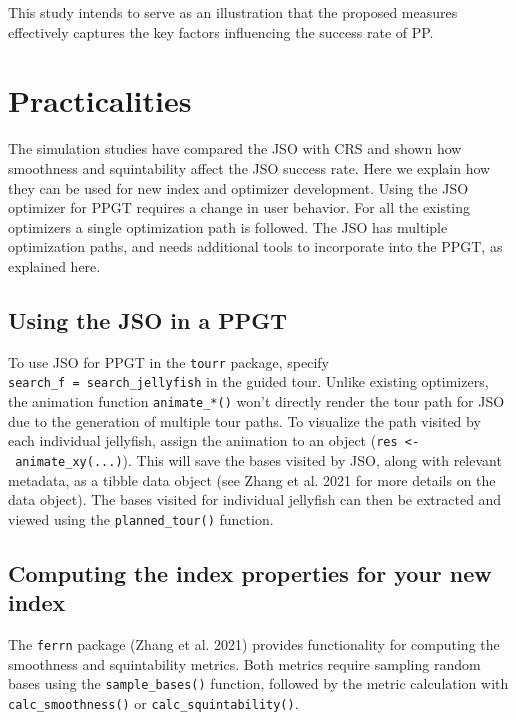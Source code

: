 \documentclass[
  12pt,
]{interact}
\theoremstyle{plain}
\begin{document}
\endgroup{}

This study intends to serve as an illustration that the proposed
measures effectively captures the key factors influencing the success
rate of PP.

\section{Practicalities}\label{sec-discussion}

The simulation studies have compared the JSO with CRS and shown how
smoothness and squintability affect the JSO success rate. Here we
explain how they can be used for new index and optimizer development.
Using the JSO optimizer for PPGT requires a change in user behavior. For
all the existing optimizers a single optimization path is followed. The
JSO has multiple optimization paths, and needs additional tools to
incorporate into the PPGT, as explained here.

\subsection{Using the JSO in a PPGT}\label{using-the-jso-in-a-ppgt}

To use JSO for PPGT in the \texttt{tourr} package, specify
\texttt{search\_f\ =\ search\_jellyfish} in the guided tour. Unlike
existing optimizers, the animation function \texttt{animate\_*()} won't
directly render the tour path for JSO due to the generation of multiple
tour paths. To visualize the path visited by each individual jellyfish,
assign the animation to an object
(\texttt{res\ \textless{}-\ animate\_xy(...)}). This will save the bases
visited by JSO, along with relevant metadata, as a tibble data object
(see Zhang et al. 2021 for more details on the data object). The bases
visited for individual jellyfish can then be extracted and viewed using
the \texttt{planned\_tour()} function.

\subsection{Computing the index properties for your new
index}\label{computing-the-index-properties-for-your-new-index}

The \texttt{ferrn} package (Zhang et al. 2021) provides functionality
for computing the smoothness and squintability metrics. Both metrics
require sampling random bases using the \texttt{sample\_bases()}
function, followed by the metric calculation with
\texttt{calc\_smoothness()} or \texttt{calc\_squintability()}.
\end{document}
